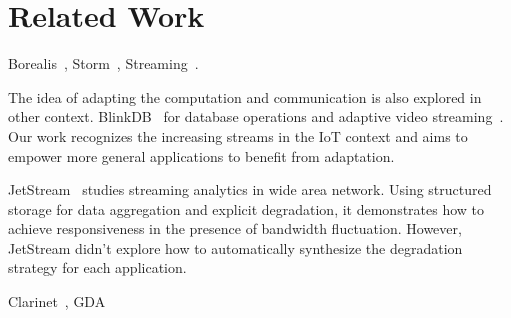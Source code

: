 \section{Related Work}
\label{sec:related-work}

Borealis~\cite{abadi2005design}, Storm~\cite{toshniwal2014storm},
Streaming~\cite{zaharia2012discretized}.

The idea of adapting the computation and communication is also explored in other
context. BlinkDB~\cite{agarwal2013blinkdb} for database operations and adaptive
video streaming~\cite{yin2015control}. Our work recognizes the increasing
streams in the IoT context and aims to empower more general applications to
benefit from adaptation.

JetStream~\cite{rabkin2014aggregation} studies streaming analytics in wide area
network. Using structured storage for data aggregation and explicit degradation,
it demonstrates how to achieve responsiveness in the presence of bandwidth
fluctuation. However, JetStream didn't explore how to automatically synthesize
the degradation strategy for each application.

Clarinet~\cite{viswanathan2016clarinet}, GDA~\cite{pu2015low}

